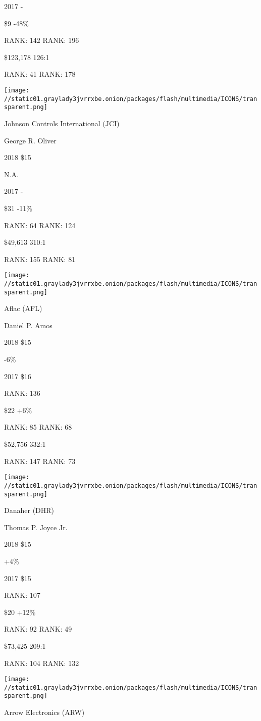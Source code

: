 2017 -

 \$9 -48\%

RANK: 142 RANK: 196

 \$123,178 126:1

RANK: 41 RANK: 178

\texttt{[image: //static01.graylady3jvrrxbe.onion/packages/flash/multimedia/ICONS/transparent.png]}

Johnson Controls International (JCI)

George R. Oliver \protect\hyperlink{g-footnotes}{}

2018 \$15

 N.A.

2017 -

 \$31 -11\%

RANK: 64 RANK: 124

 \$49,613 310:1

RANK: 155 RANK: 81

\texttt{[image: //static01.graylady3jvrrxbe.onion/packages/flash/multimedia/ICONS/transparent.png]}

Aflac (AFL)

Daniel P. Amos \protect\hyperlink{g-footnotes}{}

2018 \$15

 -6\%

2017 \$16

RANK: 136

 \$22 +6\%

RANK: 85 RANK: 68

 \$52,756 332:1

RANK: 147 RANK: 73

\texttt{[image: //static01.graylady3jvrrxbe.onion/packages/flash/multimedia/ICONS/transparent.png]}

Danaher (DHR)

Thomas P. Joyce Jr. \protect\hyperlink{g-footnotes}{}

2018 \$15

 +4\%

2017 \$15

RANK: 107

 \$20 +12\%

RANK: 92 RANK: 49

 \$73,425 209:1

RANK: 104 RANK: 132

\texttt{[image: //static01.graylady3jvrrxbe.onion/packages/flash/multimedia/ICONS/transparent.png]}

Arrow Electronics (ARW)

